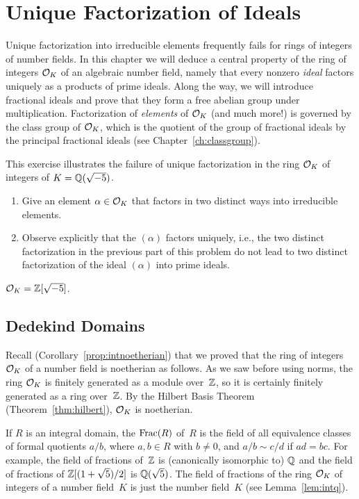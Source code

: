\chapter{Unique Factorization of Ideals}

Unique factorization into irreducible elements frequently fails for
rings of integers of number fields.  In this chapter we will deduce a
central property of the ring of integers $\mathcal{O}_K$ of an algebraic number
field, namely that every nonzero {\em ideal} factors uniquely as a
products of prime ideals.  Along the way, we will introduce fractional
ideals and prove that they form a free abelian group under
multiplication.  Factorization of {\em elements} of $\mathcal{O}_K$ (and much
more!) is governed by the class group of $\mathcal{O}_K$, which is the quotient
of the group of fractional ideals by the principal fractional ideals
(see Chapter~\ref{ch:classgroup}).

\begin{exercise}
	This exercise illustrates the failure of unique factorization in the ring
	$\mathcal{O}_K$ of integers of $K = \mathbb{Q}(\sqrt{-5})$.
	\begin{enumerate}
		\item Give an element $\alpha \in \mathcal{O}_K$ that factors in two distinct
		ways into irreducible elements.
		\item Observe explicitly that the $(\alpha)$ factors uniquely, i.e.,
		the two distinct factorization in the previous part of this problem
		do not lead to two distinct factorization of the ideal $(\alpha)$
		into prime ideals.
	\end{enumerate}
	\begin{hint}
		$\mathcal{O}_K = \mathbb{Z}[\sqrt{-5}]$.
	\end{hint}
\end{exercise}

\section{Dedekind Domains}

Recall (Corollary~\ref{prop:intnoetherian}) that we proved that the
ring of integers $\mathcal{O}_K$ of a number field is noetherian as follows.
As we saw before using norms, the ring $\mathcal{O}_K$ is finitely generated as
a module over~$\mathbb{Z}$, so it is certainly finitely generated as a ring
over~$\mathbb{Z}$.  By the Hilbert Basis Theorem (Theorem~\ref{thm:hilbert}),
$\mathcal{O}_K$ is noetherian.

If $R$ is an integral domain, the  $\operatorname{Frac}(R)$
of~$R$ is the field of all equivalence classes of formal quotients
$a/b$, where $a,b \in R$ with $b\neq 0$, and $a/b\sim c/d$ if $ad=bc$.
For example, the field of fractions of~$\mathbb{Z}$ is (canonically isomorphic
to) $\mathbb{Q}$ and the field of fractions of $\mathbb{Z}[(1+\sqrt{5})/2]$ is
$\mathbb{Q}(\sqrt{5})$.  The field of fractions of the ring $\mathcal{O}_K$ of integers
of a number field~$K$ is just the number field~$K$ (see Lemma~\ref{lem:intq}).

